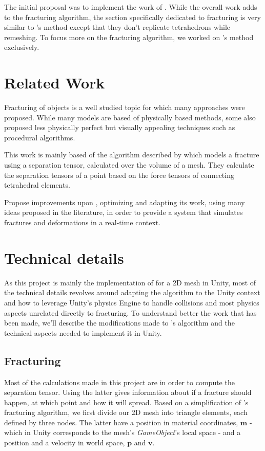 \documentclass[tog]{acmsiggraph}
\begin{document}
The initial proposal was to implement the work of \cite{Parker:2009:RTD}. While the overall work adds to the fracturing algorithm, the section specifically dedicated to fracturing is very similar to  \cite{Obrien:1999:GMA}'s method except that they don't replicate tetrahedrons while remeshing. To focus more on the fracturing algorithm, we worked on \cite{Obrien:1999:GMA}'s method exclusively. 

\section{Related Work}
Fracturing of objects is a well studied topic for which many approaches were proposed. While many models are based of physically based methods, some also proposed less physically perfect but visually appealing techniques such as procedural algorithms. 

This work is mainly based of the algorithm described by \cite{Obrien:1999:GMA} which models a fracture using a separation tensor, calculated over the volume of a mesh. They calculate the separation tensors of a point based on the force tensors of connecting tetrahedral elements. 

\cite{Parker:2009:RTD} Propose improvements upon \cite{Obrien:1999:GMA}, optimizing and adapting its work, using many ideas proposed in the literature, in order to provide a system that simulates fractures and deformations in a real-time context.

\section{Technical details}
As this project is mainly the implementation of \cite{Obrien:1999:GMA} for a 2D mesh in Unity, most of the technical details revolves around adapting the algorithm to the Unity context and how to leverage Unity's physics Engine to handle collisions and most physics aspects unrelated directly to fracturing. To understand better the work that has been made, we'll describe the modifications made to \cite{Obrien:1999:GMA}'s algorithm and the technical aspects needed to implement it in Unity.

\subsection{Fracturing}
\label{sec:Fracturing}
Most of the calculations made in this project are in order to compute the separation tensor. Using the latter gives information about if a fracture should happen, at which point and how it will spread. Based on a simplification of \cite{Obrien:1999:GMA}'s fracturing algorithm, we first divide our 2D mesh into triangle elements, each defined by three nodes. The latter have a position in material coordinates, $\pmb{m}$ - which in Unity corresponds to the mesh's \textit{GameObject}'s local space - and a position and a velocity in world space, $\pmb{p}$ and $\pmb{v}$. 
\end{document}
